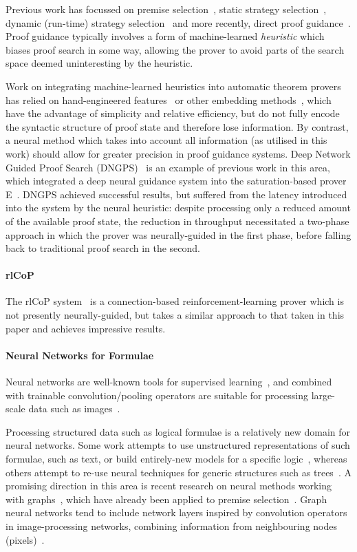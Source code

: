 \documentclass{llncs}
\begin{document}
Previous work has focussed on premise selection~\cite{DeepMath,MaSh,MaLARea,formula-graph}, static strategy selection~\cite{Bridge,MaLeS,E-MaLeS}, dynamic (run-time) strategy selection~\cite{dynamic-strategy-priority} and more recently, direct proof guidance~\cite{MaLeCoP,FEMaLeCoP,rlCoP,ENIGMA,DNGPS}.
Proof guidance typically involves a form of machine-learned \emph{heuristic} which biases proof search in some way, allowing the prover to avoid parts of the search space deemed uninteresting by the heuristic.

Work on integrating machine-learned heuristics into automatic theorem provers has relied on hand-engineered features~\cite{MaLeCoP,FEMaLeCoP,rlCoP} or other embedding methods~\cite{ENIGMA,proof-mining}, which have the advantage of simplicity and relative efficiency, but do not fully encode the syntactic structure of proof state and therefore lose information.
By contrast, a neural method which takes into account all information (as utilised in this work) should allow for greater precision in proof guidance systems.
Deep Network Guided Proof Search (DNGPS)~\cite{DNGPS} is an example of previous work in this area, which integrated a deep neural guidance system into the saturation-based prover E~\cite{E}.
DNGPS achieved successful results, but suffered from the latency introduced into the system by the neural heuristic: despite processing only a reduced amount of the available proof state, the reduction in throughput necessitated a two-phase approach in which the prover was neurally-guided in the first phase, before falling back to traditional proof search in the second.

\paragraph{rlCoP} The rlCoP system~\cite{rlCoP} is a connection-based reinforcement-learning prover which is not presently neurally-guided, but takes a similar approach to that taken in this paper and achieves impressive results.

\paragraph{Neural Networks for Formulae}
Neural networks are well-known tools for supervised learning~\cite{neural-survey}, and combined with trainable convolution/pooling operators are suitable for processing large-scale data such as images~\cite{cnn}.

Processing structured data such as logical formulae is a relatively new domain for neural networks.
Some work attempts to use unstructured representations of such formulae, such as text, or build entirely-new models for a specific logic~\cite{logical-entailment}, whereas others attempt to re-use neural techniques for generic structures such as trees~\cite{logical-tree}.
A promising direction in this area is recent research on neural methods working with graphs~\cite{graph-cnn,gcn,gcn-relational}, which have already been applied to premise selection~\cite{formula-graph}.
Graph neural networks tend to include network layers inspired by convolution operators in image-processing networks, combining information from neighbouring nodes (pixels)~\cite{gcn}.
\end{document}
